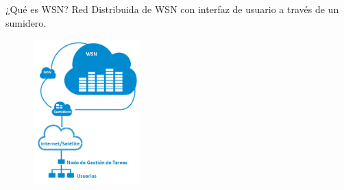 \documentclass[aspectratio=169, handout]{beamer}
\begin{document}
\begin{frame}{¿Qué es WSN?} 
\noindent Red Distribuida de WSN con interfaz de usuario a través de un sumidero.
		\begin{figure}[H]			
		\includegraphics[width=0.37\textwidth]{./imagenes/RedDistribuida.png}
		\end{figure}	  	  	
\end{frame}
\end{document}
